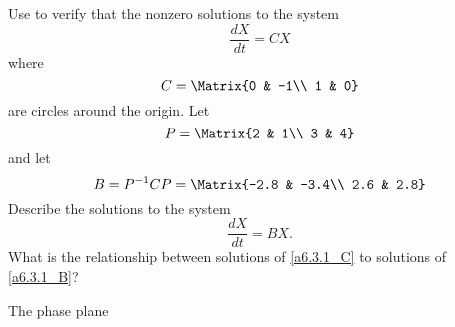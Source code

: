 \documentclass{article}
\begin{document}
\begin{exercise} \label{a6.3.1}
Use {\pplane} to verify that the nonzero solutions to the system
\[
\frac{dX}{dt} = CX
\]
where
\begin{equation} \label{a6.3.1_C}
C = \Matrix{0 & -1\\ 1 & 0}
\end{equation}
are circles around the origin.  Let 
\[
P = \Matrix{2 & 1\\ 3 & 4}
\]
and  let 
\[
B = P^{-1}CP =  \Matrix{-2.8 & -3.4\\ 2.6 & 2.8}
\]
Describe the solutions to the system
\begin{equation} \label{a6.3.1_B}
\frac{dX}{dt} = BX.
\end{equation}
What is the relationship between solutions of \eqref{a6.3.1_C} to solutions of \eqref{a6.3.1_B}?

\begin{solution}
\soln 

The phase plane 

\begin{figure}[htb]
                       \centerline{%
                       }
\end{figure}

\end{solution}
\end{exercise}
\end{document}
